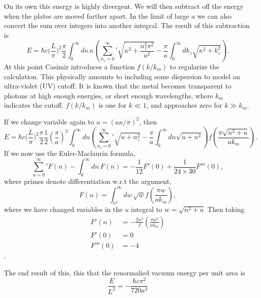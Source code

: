 On its own this energy is highly divergent.  We will then subtract off the energy when the plates are moved farther apart.  In the limit of large $a$ we can also convert the sum over integers into another integral.  The result of this subtraction is
\begin{equation}
E = \hbar c\bigg(\frac{L}{\pi}\bigg)^2\frac{\pi}{2}\int_0^\infty d\kappa\,\kappa \left({\sum_{n_z=0}^\infty}'\sqrt{\kappa^2+\frac{n_z^2\pi^2}{a^2}}-\frac{\pi}{a}\int_0^\infty dk_z\sqrt{\kappa^2+k_z^2}\right).
\end{equation}
At this point Casimir introduces a function $f(k/k_m)$ to regularize the calculation.  This physically amounts to including some dispersion to model an ultra-violet (UV) cutoff.  It is known  that the metal becomes transparent to photons at high enough energies, or short enough wavelengths, where $k_m$ indicates the cutoff.  $f(k/k_m)$ is one for $k\ll 1$, and approaches zero for $k\gg k_m$.  

If we change variable again to $u=(a\kappa/\pi)^2$, then
\begin{equation}
E = \hbar c\bigg(\frac{L}{\pi}\bigg)^2\frac{\pi}{2}\frac{1}{2}\left(\frac{\pi}{a}\right)^3\int_0^\infty du \left({\sum_{n_z=0}^\infty}'\sqrt{u+n_z^2}-\frac{\pi}{a}\int_0^\infty dn\sqrt{u+n^2}\right)f\left(\frac{\pi\sqrt{n^2+u}}{a k_m}\right).
\end{equation}
If we now use the Euler-Maclaurin formula,
\begin{equation}
{\sum_{n=0}^\infty}'  F(n) - \int_0^\infty dn\, F(n)=-\frac{1}{12}F'(0)+\frac{1}{24\times 30}F'''(0),
\end{equation}
where primes denote differentiation w.r.t the argument, 
\begin{equation}
F(n)=\int_{n^2}^\infty dw\, \sqrt{w}f\left(\frac{\pi w}{ak_m}\right),
\end{equation}
where we have changed variables in the $u$ integral to $w = \sqrt{n^2+u}$
Then taking 
\begin{align}
F'(n) & = -\frac{2n^2}f\left(\frac{\pi n^2}{a k_m}\right)\\
F'(0) & = 0\\
F'''(0) & = -4
\end{align}
.

The end result of this, this that the renormalied vacuum energy per unit area is
\begin{equation}
\frac{E}{L^2} = -\frac{\hbar c\pi^2}{720 a^3}
\end{equation}

